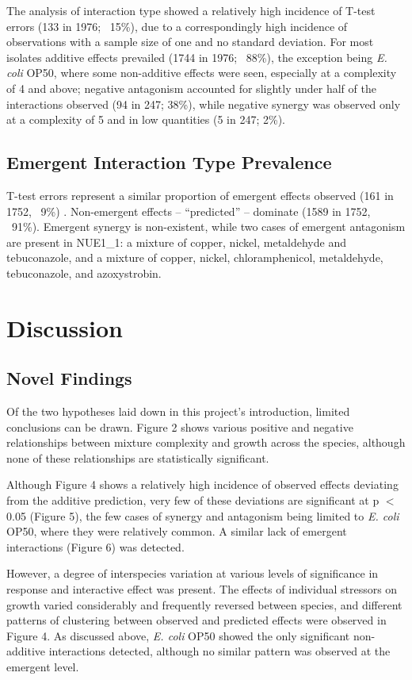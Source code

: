 \documentclass[final,1p,times]{elsarticle}
\begin{document}
The analysis of interaction type showed a relatively high incidence of T-test errors (133 in 1976; ~15\%), due to a correspondingly high incidence of observations with a sample size of one and no standard deviation. For most isolates additive effects prevailed (1744 in 1976; ~88\%), the exception being \textit{E. coli} OP50, where some non-additive effects were seen, especially at a complexity of 4 and above; negative antagonism accounted for slightly under half of the interactions observed (94 in 247; 38\%), while negative synergy was observed only at a complexity of 5 and in low quantities (5 in 247; 2\%).

\subsection{Emergent Interaction Type Prevalence}
\label{S:3:7}

T-test errors represent a similar proportion of emergent effects observed (161 in 1752, ~9\%) . Non-emergent effects – “predicted” – dominate (1589 in 1752, ~91\%). Emergent synergy is non-existent, while two cases of emergent antagonism are present in NUE1\_1: a mixture of copper, nickel, metaldehyde and tebuconazole, and a mixture of copper, nickel, chloramphenicol, metaldehyde, tebuconazole, and azoxystrobin.

\section{Discussion}
\label{S:4}

\subsection{Novel Findings}
\label{S:4:1}

Of the two hypotheses laid down in this project’s introduction, limited conclusions can be drawn. Figure 2 shows various positive and negative relationships between mixture complexity and growth across the species, although none of these relationships are statistically significant. 

Although Figure 4 shows a relatively high incidence of observed effects deviating from the additive prediction, very few of these deviations are significant at p $<$ 0.05 (Figure 5), the few cases of synergy and antagonism being limited to \textit{E. coli} OP50, where they were relatively common. A similar lack of emergent interactions (Figure 6) was detected. 

However, a degree of interspecies variation at various levels of significance in response and interactive effect was present. The effects of individual stressors on growth varied considerably and frequently reversed between species, and different patterns of clustering between observed and predicted effects were observed in Figure 4. As discussed above, \textit{E. coli} OP50 showed the only significant non-additive interactions detected, although no similar pattern was observed at the emergent level. 
\end{document}
